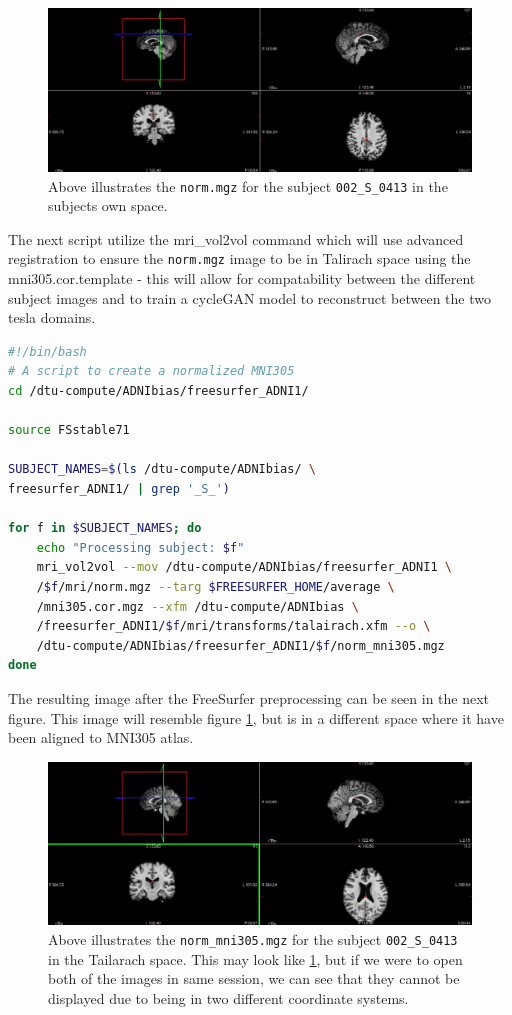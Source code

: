 \documentclass[12pt, fleqn, titlepage]{article}
\begin{document}
\begin{figure}[H]
	\centering
	\includegraphics[width=0.9\linewidth]{imgs/norm}
	\caption{Above illustrates the \texttt{norm.mgz} for the subject \texttt{002\_S\_0413} in the subjects own space.} 
	\label{fig:norm}
\end{figure}

The next script utilize the mri\_vol2vol command which will use advanced registration to ensure the \texttt{norm.mgz} image to be in Talirach space using the mni305.cor.template - this will allow for compatability between the different subject images and to train a cycleGAN model to reconstruct between the two tesla domains.

\begin{lstlisting}[language=bash,caption={FreeSurfer mri\_vol2vol}]
#!/bin/bash 
# A script to create a normalized MNI305
cd /dtu-compute/ADNIbias/freesurfer_ADNI1/

source FSstable71

SUBJECT_NAMES=$(ls /dtu-compute/ADNIbias/ \ 
freesurfer_ADNI1/ | grep '_S_')

for f in $SUBJECT_NAMES; do 
	echo "Processing subject: $f"
	mri_vol2vol --mov /dtu-compute/ADNIbias/freesurfer_ADNI1 \
	/$f/mri/norm.mgz --targ $FREESURFER_HOME/average \
	/mni305.cor.mgz --xfm /dtu-compute/ADNIbias \ 
	/freesurfer_ADNI1/$f/mri/transforms/talairach.xfm --o \
	/dtu-compute/ADNIbias/freesurfer_ADNI1/$f/norm_mni305.mgz
done
\end{lstlisting}

\noindent
The resulting image after the FreeSurfer preprocessing can be seen in the next figure. This image will resemble figure \ref{fig:norm}, but is in a different space where it have been aligned to MNI305 atlas. 

\begin{figure}[H]
	\centering
	\includegraphics[width=0.7\linewidth]{imgs/norm_305}
	\caption{Above illustrates the \texttt{norm\_mni305.mgz} for the subject \texttt{002\_S\_0413} in the Tailarach space. This may look like \ref{fig:norm}, but if we were to open both of the images in same session, we can see that they cannot be displayed due to being in two different coordinate systems. } 
	\label{fig:norm305}
\end{figure}
\end{document}
